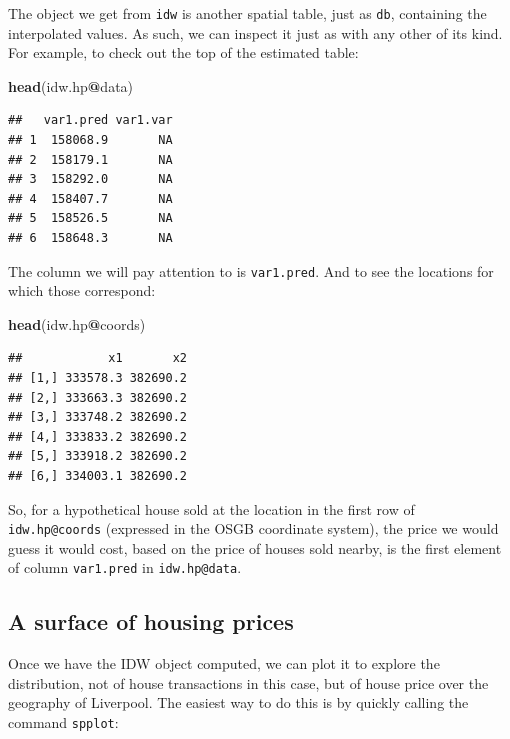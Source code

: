 \documentclass[]{book}
\newenvironment{Shaded}{\begin{snugshade}}{\end{snugshade}}
\newcommand{\KeywordTok}[1]{\textcolor[rgb]{0.13,0.29,0.53}{\textbf{#1}}}
\newcommand{\NormalTok}[1]{#1}
\newcommand{\OperatorTok}[1]{\textcolor[rgb]{0.81,0.36,0.00}{\textbf{#1}}}
\begin{document}
The object we get from \texttt{idw} is another spatial table, just as \texttt{db}, containing the interpolated values. As such, we can inspect it just as with any other of its kind. For example, to check out the top of the estimated table:

\begin{Shaded}
\begin{Highlighting}[]
\KeywordTok{head}\NormalTok{(idw.hp}\OperatorTok{@}\NormalTok{data)}
\end{Highlighting}
\end{Shaded}

\begin{verbatim}
##   var1.pred var1.var
## 1  158068.9       NA
## 2  158179.1       NA
## 3  158292.0       NA
## 4  158407.7       NA
## 5  158526.5       NA
## 6  158648.3       NA
\end{verbatim}

The column we will pay attention to is \texttt{var1.pred}. And to see the locations for which those correspond:

\begin{Shaded}
\begin{Highlighting}[]
\KeywordTok{head}\NormalTok{(idw.hp}\OperatorTok{@}\NormalTok{coords)}
\end{Highlighting}
\end{Shaded}

\begin{verbatim}
##            x1       x2
## [1,] 333578.3 382690.2
## [2,] 333663.3 382690.2
## [3,] 333748.2 382690.2
## [4,] 333833.2 382690.2
## [5,] 333918.2 382690.2
## [6,] 334003.1 382690.2
\end{verbatim}

So, for a hypothetical house sold at the location in the first row of \texttt{idw.hp@coords} (expressed in the OSGB coordinate system), the price we would guess it would cost, based on the price of houses sold nearby, is the first element of column \texttt{var1.pred} in \texttt{idw.hp@data}.

\hypertarget{a-surface-of-housing-prices}{%
\subsection{A surface of housing prices}\label{a-surface-of-housing-prices}}

Once we have the IDW object computed, we can plot it to explore the distribution, not of house transactions in this case, but of house price over the geography of Liverpool. The easiest way to do this is by quickly calling the command \texttt{spplot}:
\end{document}
